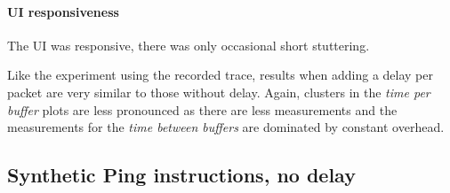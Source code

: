\paragraph{UI responsiveness}

The UI was responsive, there was only occasional short stuttering.
\bigbreak

Like the experiment using the recorded trace, results when adding a delay per packet are very similar
to those without delay. Again, clusters in the \textit{time per buffer} plots are less pronounced as
there are less measurements and the measurements for the \textit{time between buffers} are dominated
by constant overhead.

\subsection{Synthetic Ping instructions, no delay}
\label{evaluation/results/synthetic-ping-instructions-no-delay}

